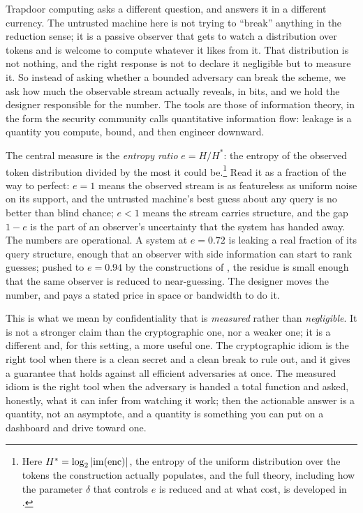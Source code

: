 Trapdoor computing asks a different question, and answers it in a different
currency. The untrusted machine here is not trying to ``break'' anything in
the reduction sense; it is a passive observer that gets to watch a
distribution over tokens and is welcome to compute whatever it likes from
it. That distribution is not nothing, and the right response is not to
declare it negligible but to measure it. So instead of asking whether a
bounded adversary can break the scheme, we ask how much the observable
stream actually reveals, in bits, and we hold the designer responsible for
the number. The tools are those of information theory, in the form the
security community calls quantitative information flow: leakage is a
quantity you compute, bound, and then engineer downward.

The central measure is the \emph{entropy ratio} $e = H / H^{*}$: the
entropy of the observed token distribution divided by the most it could
be.\footnote{Here $H^{*} = \log_2 |\mathrm{im}(\operatorname{enc})|$, the entropy of the
uniform distribution over the tokens the construction actually populates,
and the full theory, including how the parameter $\delta$ that controls
$e$ is reduced and at what cost, is developed in
.} Read it as a fraction of the way to perfect:
$e = 1$ means the observed stream is as featureless as uniform noise on its
support, and the untrusted machine's best guess about any query is no
better than blind chance; $e < 1$ means the stream carries structure, and
the gap $1 - e$ is the part of an observer's uncertainty that the system
has handed away. The numbers are operational. A system at $e = 0.72$ is
leaking a real fraction of its query structure, enough that an observer
with side information can start to rank guesses; pushed to $e = 0.94$ by
the constructions of , the residue is small
enough that the same observer is reduced to near-guessing. The designer
moves the number, and pays a stated price in space or bandwidth to do it.

This is what we mean by confidentiality that is \emph{measured} rather than
\emph{negligible}. It is not a stronger claim than the cryptographic one,
nor a weaker one; it is a different and, for this setting, a more useful
one. The cryptographic idiom is the right tool when there is a clean secret
and a clean break to rule out, and it gives a guarantee that holds against
all efficient adversaries at once. The measured idiom is the right tool
when the adversary is handed a total function and asked, honestly, what it
can infer from watching it work; then the actionable answer is a quantity,
not an asymptote, and a quantity is something you can put on a dashboard and
drive toward one.

